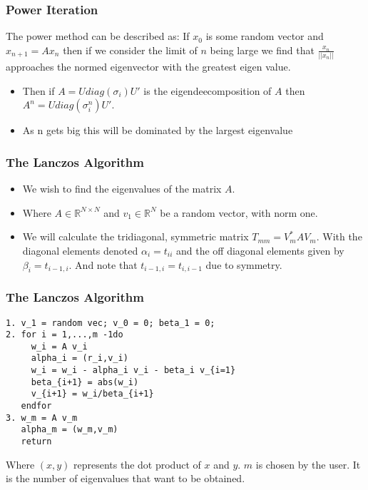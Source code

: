 \documentclass[pdf]{beamer}
\begin{document}
\begin{frame}
\frametitle{Power Iteration}

The power method can be described as: If $x_0$ is some random vector and $x_{n+1}=A x_n$ then if we consider the limit of $n$ being large we find that $\frac{x_n}{||x_n||}$ approaches the normed eigenvector with the greatest eigen value. 
\begin{itemize}
\item Then if $A=U {diag} (\sigma_i) U'$ is the eigendeecomposition of $A$ then $A^n = U {diag}(\sigma^n_i) U'$.
\item As n gets big this will be dominated by the largest eigenvalue
\end{itemize}
\end{frame}



\begin{frame}
\frametitle{The Lanczos Algorithm}
\begin{itemize}
\item We wish to find the eigenvalues of the matrix $A$.

\item Where $A \in \mathbb{R}^{N \times N}$ and $v_1 \in \mathbb{R}^N$ be a random vector, with norm one.

\item We will calculate the tridiagonal, symmetric matrix $T_{mm} = V_m^* A V_m$. With the diagonal elements denoted $\alpha_i=t_{ii}$ and the off diagonal elements given by $\beta_i = t_{i-1,i}$. And note that $t_{i-1,i}=t_{i,i-1}$ due to symmetry.
\end{itemize}

\end{frame}


\begin{frame}[fragile]
\frametitle{The Lanczos Algorithm}
\begin{verbatim}
1. v_1 = random vec; v_0 = 0; beta_1 = 0;
2. for i = 1,...,m -1do
     w_i = A v_i
     alpha_i = (r_i,v_i)
     w_i = w_i - alpha_i v_i - beta_i v_{i=1}
     beta_{i+1} = abs(w_i)
     v_{i+1} = w_i/beta_{i+1}
   endfor
3. w_m = A v_m
   alpha_m = (w_m,v_m)
   return
\end{verbatim}

Where $(x,y)$ represents the dot product of $x$ and $y$. $m$ is chosen by the user. It is the number of eigenvalues that want to be obtained.


\end{frame}
\end{document}
